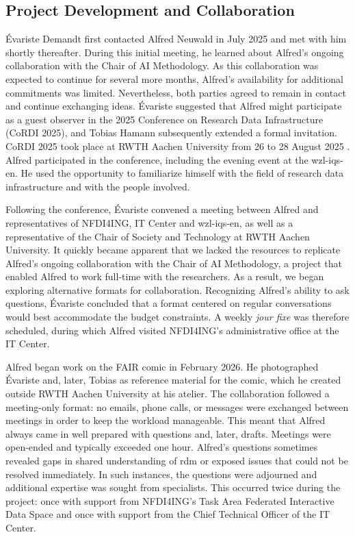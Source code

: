 \documentclass{inggrid}
\begin{document}
\subsection{Project Development and Collaboration}
Évariste Demandt first contacted Alfred Neuwald in July 2025 and met with him shortly thereafter. During this initial meeting, he learned about Alfred's ongoing collaboration with the Chair of AI Methodology. As this collaboration was expected to continue for several more months, Alfred's availability for additional commitments was limited. Nevertheless, both parties agreed to remain in contact and continue exchanging ideas. 
Évariste suggested that Alfred might participate as a guest observer in the 2025 Conference on Research Data Infrastructure (CoRDI 2025), and Tobias Hamann subsequently extended a formal invitation. 
CoRDI 2025 took place at RWTH Aachen University from 26 to 28 August 2025 \cite{nfdi_ev_cordi_nodate}. 
Alfred participated in the
conference, including the evening event at the \ac{wzl-iqs-en}.
He used the opportunity to familiarize himself with the field of research data infrastructure and with the people involved.

Following the conference, Évariste convened a meeting between Alfred and representatives of NFDI4ING, IT Center and \ac{wzl-iqs-en}, as well as a representative of the Chair of Society and Technology at RWTH Aachen University. It quickly became apparent that we lacked the resources to replicate Alfred's ongoing collaboration with the Chair of AI Methodology, a project that enabled Alfred to work full-time with the researchers. As a result, we began exploring alternative formats for collaboration. Recognizing Alfred's ability to ask questions, Évariste concluded that a format centered on regular conversations would best accommodate the budget constraints. A weekly \textit{jour fixe} was therefore scheduled, during which Alfred visited NFDI4ING's administrative office at the IT Center.

Alfred began work on the FAIR comic in February 2026. He photographed Évariste and, later, Tobias as reference material for the comic, which he created outside RWTH Aachen University at his atelier. The collaboration followed a meeting-only format: no emails, phone calls, or messages were exchanged between meetings in order to keep the workload manageable. This meant that Alfred always came in well prepared with questions and, later, drafts. Meetings were open-ended and typically exceeded one hour. Alfred's questions sometimes revealed gaps in shared understanding of \ac{rdm} or exposed issues that could not be resolved immediately. In such instances, the questions were adjourned and additional expertise was sought from specialists. This occurred twice during the project: once with support from NFDI4ING's Task Area Federated Interactive Data Space and once with support from the Chief Technical Officer of the IT Center.
\end{document}
